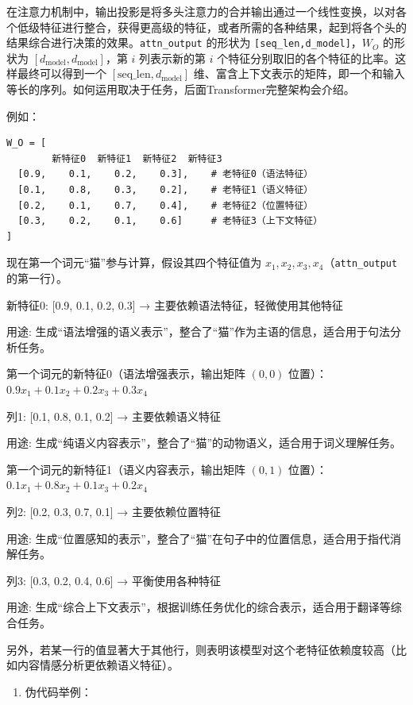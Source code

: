 在注意力机制中，输出投影是将多头注意力的合并输出通过一个线性变换，以对各个低级特征进行整合，获得更高级的特征，或者所需的各种结果，起到将各个头的结果综合进行决策的效果。\texttt{attn\_output} 的形状为 \texttt{{[}seq\_len,d\_model{]}}，\(W_O\) 的形状为 \([d_{\mathrm{model}},d_{\mathrm{model}}]\)，第 \(i\) 列表示新的第 \(i\) 个特征分别取旧的各个特征的比率。这样最终可以得到一个 \([\mathrm{seq\_len},d_{\mathrm{model}}]\) 维、富含上下文表示的矩阵，即一个和输入等长的序列。如何运用取决于任务，后面Transformer完整架构会介绍。

例如：

\begin{verbatim}
W_O = [
        新特征0  新特征1  新特征2  新特征3
  [0.9,    0.1,    0.2,    0.3],    # 老特征0（语法特征）
  [0.1,    0.8,    0.3,    0.2],    # 老特征1（语义特征）
  [0.2,    0.1,    0.7,    0.4],    # 老特征2（位置特征）
  [0.3,    0.2,    0.1,    0.6]     # 老特征3（上下文特征）
]
\end{verbatim}

现在第一个词元``猫''参与计算，假设其四个特征值为 \(x_1,x_2,x_3,x_4\)（\texttt{attn\_output} 的第一行）。

新特征0: {[}0.9, 0.1, 0.2, 0.3{]} → 主要依赖语法特征，轻微使用其他特征

用途: 生成``语法增强的语义表示''，整合了``猫''作为主语的信息，适合用于句法分析任务。

第一个词元的新特征0（语法增强表示，输出矩阵 \((0,0)\) 位置）：\(0.9x_1+0.1x_2+0.2x_3+0.3x_4\)

列1: {[}0.1, 0.8, 0.1, 0.2{]} → 主要依赖语义特征

用途: 生成``纯语义内容表示''，整合了``猫''的动物语义，适合用于词义理解任务。

第一个词元的新特征1（语义内容表示，输出矩阵 \((0,1)\) 位置）：\(0.1x_1+0.8x_2+0.1x_3+0.2x_4\)

列2: {[}0.2, 0.3, 0.7, 0.1{]} → 主要依赖位置特征

用途: 生成``位置感知的表示''，整合了``猫''在句子中的位置信息，适合用于指代消解任务。

列3: {[}0.3, 0.2, 0.4, 0.6{]} → 平衡使用各种特征

用途: 生成``综合上下文表示''，根据训练任务优化的综合表示，适合用于翻译等综合任务。

另外，若某一行的值显著大于其他行，则表明该模型对这个老特征依赖度较高（比如内容情感分析更依赖语义特征）。

\begin{enumerate}
\def\labelenumi{\arabic{enumi}.}
\setcounter{enumi}{4}
\tightlist
\item
  伪代码举例：
\end{enumerate}

